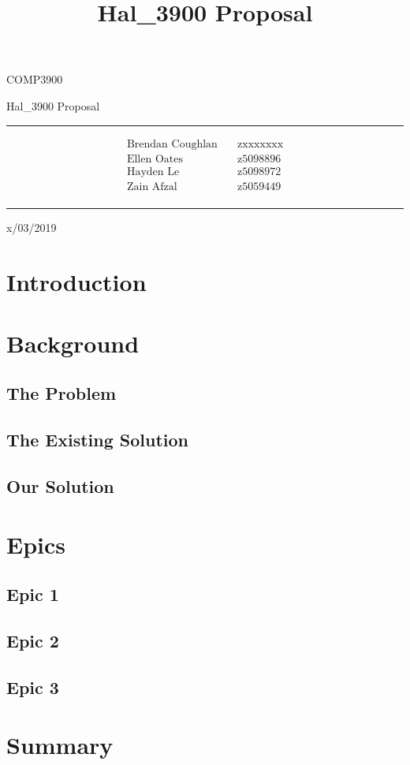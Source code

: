 \documentclass{article}
\title{Hal\_3900 Proposal}
\begin{document}
\begin{LARGE}
\begin{center}
\vspace*{15mm}

COMP3900

Hal\_3900 Proposal

\rule[4.5pt]{0.61\textwidth}{0.3pt}

\begin{align*}
  \text{Brendan Coughlan}   \quad   &\text{zxxxxxxx} \\
  \text{Ellen Oates}        \quad   &\text{z5098896} \\
  \text{Hayden Le}          \quad   &\text{z5098972} \\
  \text{Zain Afzal}         \quad   &\text{z5059449} \\
\end{align*}

\rule[4.5pt]{0.61\textwidth}{0.3pt}

x/03/2019

\end{center}
\end{LARGE}
\newpage


\section{Introduction}


\section{Background}
\subsection{The Problem}


\subsection{The Existing Solution}


\subsection{Our Solution}


\section{Epics}
\subsection{Epic 1}


\subsection{Epic 2}


\subsection{Epic 3}


\section{Summary}
\end{document}
